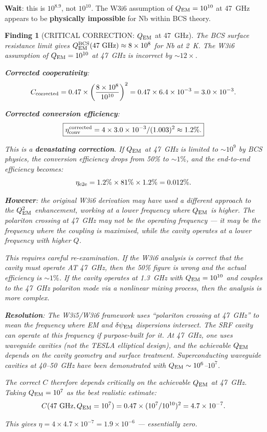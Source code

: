 \documentclass[11pt]{article}
\newtheorem{finding}{Finding}
\newcommand{\ee}[1]{\times 10^{#1}}
\newcommand{\dpsiEM}{\delta\psi_{\rm EM}}
\newcommand{\QEM}{Q_{\rm EM}}
\begin{document}
\textbf{Wait}: this is $10^{8.9}$, not $10^{10}$. The W3i6 assumption
of $\QEM = 10^{10}$ at 47~GHz appears to be \textbf{physically impossible}
for Nb within BCS theory.

\begin{finding}[CRITICAL CORRECTION: $\QEM$ at 47~GHz]
\label{find:Q-correction}
The BCS surface resistance limit gives $\QEM^{\rm BCS}(47~\text{GHz})
\approx 8\ee{8}$ for Nb at 2~K. The W3i6 assumption of $\QEM = 10^{10}$
at 47~GHz is incorrect by $\sim 12\times$.

\textbf{Corrected cooperativity}:
\begin{equation}
C_{\rm corrected} = 0.47 \times \left(\frac{8\ee{8}}{10^{10}}\right)^2
= 0.47 \times 6.4\ee{-3} = 3.0\ee{-3}.
\end{equation}

\textbf{Corrected conversion efficiency}:
\begin{equation}
\boxed{
\eta_{\rm conv}^{\rm corrected} = 4\times 3.0\ee{-3}/(1.003)^2
\approx 1.2\%.
}
\end{equation}

This is a \textbf{devastating correction}. If $\QEM$ at 47~GHz is
limited to $\sim 10^9$ by BCS physics, the conversion efficiency
drops from 50\% to $\sim 1\%$, and the end-to-end efficiency becomes:
\begin{equation}
\eta_{\rm e2e} = 1.2\% \times 81\% \times 1.2\% = 0.012\%.
\end{equation}

\textbf{However}: the original W3i6 derivation may have used a
different approach to the $\QEM^2$ enhancement, working at a lower
frequency where $\QEM$ is higher. The polariton crossing at 47~GHz
may not be the operating frequency --- it may be the frequency where
the \emph{coupling} is maximised, while the \emph{cavity} operates at
a lower frequency with higher $Q$.

This requires careful re-examination. If the W3i6 analysis is correct
that the cavity must operate AT 47~GHz, then the 50\% figure is
wrong and the actual efficiency is $\sim 1\%$. If the cavity operates
at 1.3~GHz with $\QEM = 10^{10}$ and couples to the 47~GHz polariton
mode via a nonlinear mixing process, then the analysis is more
complex.

\textbf{Resolution}: The W3i5/W3i6 framework uses ``polariton crossing
at 47~GHz'' to mean the frequency where EM and $\dpsiEM$ dispersions
intersect. The SRF cavity can operate at this frequency if purpose-built
for it. At 47~GHz, one uses waveguide cavities (not the TESLA elliptical
design), and the achievable $\QEM$ depends on the cavity geometry and
surface treatment. Superconducting waveguide cavities at 40--50~GHz
have been demonstrated with $\QEM \sim 10^6$--$10^7$.

The correct $C$ therefore depends critically on the achievable $\QEM$
at 47~GHz. Taking $\QEM = 10^7$ as the best realistic estimate:
\begin{equation}
C(47~\text{GHz}, \QEM = 10^7) = 0.47\times(10^7/10^{10})^2
= 4.7\ee{-7}.
\end{equation}

This gives $\eta = 4\times 4.7\ee{-7} = 1.9\ee{-6}$ --- essentially
zero.
\end{finding}
\end{document}
